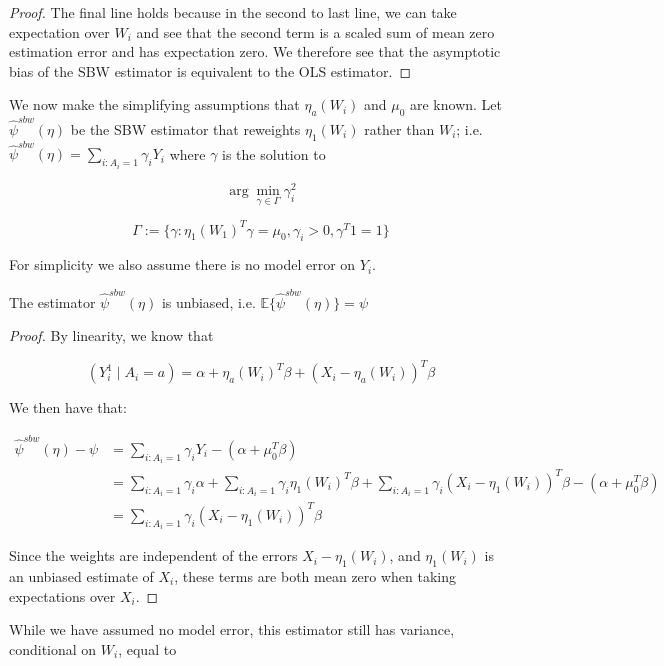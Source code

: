 \documentclass{article}
\begin{document}
\begin{appendix}
\begin{proof}
The final line holds because in the second to last line, we can take expectation over $W_i$ and see that the second term is a scaled sum of mean zero estimation error and has expectation zero. We therefore see that the asymptotic bias of the SBW estimator is equivalent to the OLS estimator.
\end{proof}


We now make the simplifying assumptions that $\eta_a(W_i)$ and $\mu_0$ are known. Let $\hat{\psi}^{sbw}(\eta)$ be the SBW estimator that reweights $\eta_1(W_i)$ rather than $W_i$; i.e. $\hat{\psi}^{sbw}(\eta) = \sum_{i: A_i = 1}\gamma_iY_i$ where $\gamma$ is the solution to

$$
\arg\min_{\gamma \in \Gamma} \gamma_i^2
$$

$$
\Gamma := \{\gamma: \eta_1(W_1)^T\gamma = \mu_0, \gamma_i > 0, \gamma^T1 = 1\}
$$

For simplicity we also assume there is no model error on $Y_i$. 

\begin{claim}
The estimator $\hat{\psi}^{sbw}(\eta)$ is unbiased, i.e.
$\mathbb{E}\{\hat{\psi}^{sbw}(\eta)\} = \psi$
\end{claim}

\begin{proof}
By linearity, we know that

$$
(Y_i^1 \mid A_i = a) = \alpha + \eta_a(W_i)^T\beta + (X_i - \eta_a(W_i))^T\beta
$$

We then have that:

\begin{align*}
    \hat{\psi}^{sbw}(\eta) - \psi &= \sum_{i: A_i = 1}\gamma_iY_i - (\alpha + \mu_0^T\beta) \\
    &= \sum_{i: A_i = 1}\gamma_i\alpha + \sum_{i: A_i = 1}\gamma_i\eta_1(W_i)^T\beta + \sum_{i: A_i = 1}\gamma_i(X_i - \eta_1(W_i))^T\beta - (\alpha + \mu_0^T\beta) \\
    &= \sum_{i: A_i = 1}\gamma_i(X_i - \eta_1(W_i))^T\beta
\end{align*}

Since the weights are independent of the errors $X_i - \eta_1(W_i)$, and $\eta_1(W_i)$ is an unbiased estimate of $X_i$, these terms are both mean zero when taking expectations over $X_i$. 
\end{proof}

\begin{remark}
While we have assumed no model error, this estimator still has variance, conditional on $W_i$, equal to


\end{remark}
\end{appendix}
\end{document}
